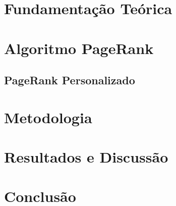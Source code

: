 \documentclass[english,portuguese,10pt,a4paper]{article}
\begin{document}
	\section{Fundamentação Teórica}
	\lipsum[1-10]
	\newpage
	\section{Algoritmo PageRank}
	\lipsum[1-10]
	\subsection{PageRank Personalizado}
	\lipsum[1-10]
	\section{Metodologia}
	\lipsum[1-10]
	\section{Resultados e Discussão}
	\lipsum[1-10]
	\section{Conclusão}
	\lipsum[1-10]
	
\end{document}
